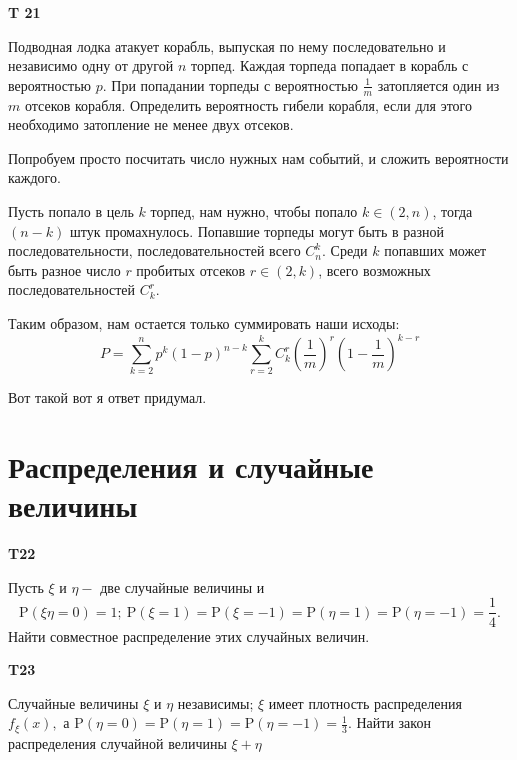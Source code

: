 \documentclass[a4paper,12pt]{article} %
\begin{document}
\begin{example}\textbf{T 21}

Подводная лодка атакует корабль, выпуская по нему последовательно и независимо одну от другой $n$ торпед. 
Каждая торпеда попадает в корабль с вероятностью $p .$ 
При попадании торпеды с вероятностью $\frac{1}{m}$ затопляется один из $m$ отсеков корабля. 
Определить вероятность гибели корабля, если для этого необходимо затопление не менее двух отсеков.


Попробуем просто посчитать число нужных нам событий, и сложить вероятности каждого.

Пусть попало в цель $k$ торпед, нам нужно, чтобы попало $ k\in (2,n)$,  тогда $ (n-k)$ штук промахнулось. Попавшие торпеды могут быть в разной последовательности, последовательностей всего $ C_n^k $.
Среди $k$ попавших может быть разное число $r$ пробитых отсеков $ r\in (2,k) $, всего возможных последовательностей $C_k^r$.

Таким образом, нам остается только суммировать наши исходы:
\[ P=\sum_{k=2}^{n}p^k(1-p)^{n-k}\sum_{r=2}^{k} C_k^r \left(\frac{1}{m}\right)^r 
\left(1-\frac{1}{m}\right)^{k-r}\]

Вот такой вот я ответ придумал.


\end{example}






\section{Распределения и случайные величины}


\begin{example}\textbf{T22}


Пусть $\xi$ и $\eta-$ две случайные величины и 
$$\mathrm{P}(\xi \eta=0)=1; \
\mathrm{P}(\xi=1)=\mathrm{P}(\xi=-1)=\mathrm{P}(\eta=1)=
\mathrm{P}(\eta=-1)=\frac{1}{4}.$$ 
Найти совместное распределение этих случайных величин.






\end{example}


\begin{example}\textbf{T23}

Случайные величины $\xi$ и $\eta$ независимы; $\xi$ имеет плотность распределения $f_{\xi}(x),$ а 
$\mathrm{P}(\eta=0)=\mathrm{P}(\eta=1)=\mathrm{P}(\eta=-1)=\frac{1}{3}$. 
Найти закон распределения случайной величины $\xi+\eta$


\end{example}
\end{document}

